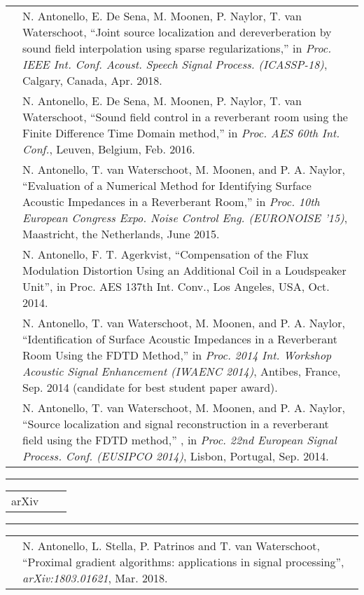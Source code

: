 \documentclass[10pt,A4]{article}
\newcommand{\tzlarrow}{(0,0) -- (0.2,0) -- (0.3,0.2) -- (0.2,0.4) -- (0,0.4) -- (0.1,0.2) -- cycle;}
\newcommand{\larrow}[1]
{\begin{tikzpicture}[scale=0.58]
	 \filldraw[fill=#1!100,draw=#1!100!black]  \tzlarrow
 \end{tikzpicture}
}
\newcommand{\cveventnone}[3]
{
\vspace{8pt}
	\begin{tabular*}{1\textwidth}{p{5.3cm}  p{4.8cm} x{6.9cm}}
 \textcolor{bgcol}{#1}& \textbf{#2} & \vspace{2.5pt}\textcolor{sectcol}{#3}

	\end{tabular*}
	\vspace{-12pt}
\textcolor{softcol}{\hrule}
}
\begin{document}
	\begin{tabular*}{1\textwidth}{p{0.3cm} p{16.4cm}}
& \larrow{bgcol}
N. Antonello, E. De Sena, M. Moonen, P. Naylor, T. van Waterschoot, ``Joint source localization and dereverberation by sound field interpolation using sparse regularizations,''  in {\em Proc. IEEE Int. Conf. Acoust. Speech Signal Process. (ICASSP-18)}, Calgary, Canada, Apr. 2018.
\\[6pt]


& \larrow{bgcol}
N. Antonello, E. De Sena, M. Moonen, P. Naylor, T. van Waterschoot, ``Sound field control in a reverberant room using the Finite Difference Time Domain method,'' in {\em Proc. AES 60th Int. Conf.}, Leuven, Belgium, Feb. 2016.
\\[6pt]

& \larrow{bgcol}
{N. Antonello, T. van Waterschoot, M. Moonen, and P. A. Naylor}, {``Evaluation of a Numerical Method for Identifying Surface Acoustic Impedances in a Reverberant Room,''} in {\em Proc. 10th European Congress Expo. Noise Control Eng. (EURONOISE '15)}, Maastricht, the Netherlands, June 2015.
\\[3pt]

& \larrow{bgcol}
N. Antonello, F. T. Agerkvist, ``Compensation of the Flux Modulation Distortion Using an Additional Coil in a Loudspeaker Unit'', in Proc. AES 137th Int. Conv., Los Angeles, USA, Oct. 2014.
\\[3pt]

& \larrow{bgcol}
{N. Antonello, T. van Waterschoot, M. Moonen, and P. A. Naylor},{ ``Identification of Surface Acoustic Impedances in a Reverberant Room Using the FDTD Method,''} in {\em Proc. 2014 Int. Workshop Acoustic Signal Enhancement (IWAENC 2014)}, Antibes, France, Sep. 2014 (candidate for best student paper award).
\\[3pt]


& \larrow{bgcol}
{N. Antonello, T. van Waterschoot, M. Moonen, and P. A. Naylor},{ ``Source localization and signal reconstruction in a reverberant field using the FDTD method,''} , in {\em Proc. 22nd European Signal Process. Conf. (EUSIPCO 2014)}, Lisbon, Portugal, Sep. 2014.
\\[3pt]

	\end{tabular*}

\textcolor{softcol}{\hrule}
\cveventnone{arXiv}{}{ }
\vspace{6pt}

	\begin{tabular*}{1\textwidth}{p{0.3cm} p{16.4cm}}
&		 \larrow{bgcol}  N. Antonello, L. Stella, P. Patrinos and T. van Waterschoot, ``Proximal gradient algorithms: applications in signal processing'', {\em arXiv:1803.01621}, Mar. 2018.\\[3pt]

	\end{tabular*}
\end{document}
